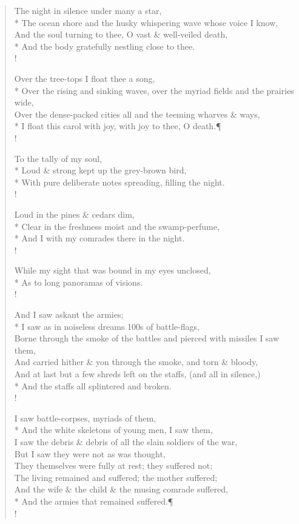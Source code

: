 \documentclass[MAIN]{subfiles}
\begin{document}
\begin{verse}
The night in silence under many a star,\\*
The ocean shore and the husky whispering wave whose voice I know,\\
And the soul turning to thee, O vast \& well-veiled death,\\*
And the body gratefully nestling close to thee.\\!

Over the tree-tops I float thee a song,\\*
Over the rising and sinking waves, over the myriad fields and the prairies wide,\\
Over the dense-packed cities all and the teeming wharves \& ways,\\*
I float this carol with joy, with joy to thee, O death.\P\\!

To the tally of my soul,\\*
Loud \& strong kept up the grey-brown bird,\\*
With pure deliberate notes spreading, filling the night.\\!

Loud in the pines \& cedars dim,\\*
Clear in the freshness moist and the swamp-perfume,\\*
And I with my comrades there in the night.\\!

While my sight that was bound in my eyes unclosed,\\*
As to long panoramas of visions.\\!

And I saw askant the armies;\\*
I saw as in noiseless dreams 100s of battle-flags,\\
Borne through the smoke of the battles and pierced with missiles I saw them,\\
And carried hither \& yon through the smoke, and torn \& bloody,\\
And at last but a few shreds left on the staffs, (and all in silence,)\\*
And the staffs all splintered and broken.\\! 

I saw battle-corpses, myriads of them,\\*
And the white skeletons of young men, I saw them,\\
I saw the debris \& debris of all the slain soldiers of the war,\\
But I saw they were not as was thought,\\
They themselves were fully at rest; they suffered not;\\
The living remained and suffered; the mother suffered;\\
And the wife \& the child \& the musing comrade suffered,\\*
And the armies that remained suffered.\P\\!


\end{verse}
\end{document}
